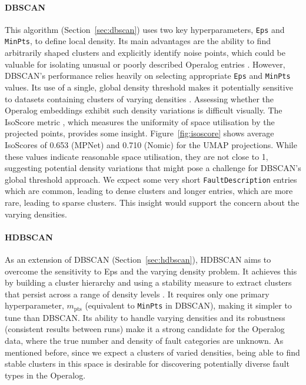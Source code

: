 \documentclass[10pt,oneside]{report}
\begin{document}
\paragraph{DBSCAN} This algorithm (Section~\ref{sec:dbscan}) uses two key hyperparameters, \texttt{Eps} and \texttt{MinPts}, to define local density. Its main advantages are the ability to find arbitrarily shaped clusters and explicitly identify noise points, which could be valuable for isolating unusual or poorly described Operalog entries \cite{ester1996density}. However, DBSCAN's performance relies heavily on selecting appropriate \texttt{Eps} and \texttt{MinPts} values. Its use of a single, global density threshold makes it potentially sensitive to datasets containing clusters of varying densities \cite{campello2013density}. Assessing whether the Operalog embeddings exhibit such density variations is difficult visually. The IsoScore metric \cite{rudman2021isoscore}, which measures the uniformity of space utilisation by the projected points, provides some insight. Figure~\ref{fig:isoscore} shows average IsoScores of 0.653 (MPNet) and 0.710 (Nomic) for the UMAP projections. While these values indicate reasonable space utilisation, they are not close to 1, suggesting potential density variations that might pose a challenge for DBSCAN's global threshold approach. We expect some very short \texttt{FaultDescription} entries which are common, leading to dense clusters and longer entries, which are more rare, leading to sparse clusters. This insight would support the concern about the varying densities.

\paragraph{HDBSCAN} As an extension of DBSCAN (Section~\ref{sec:hdbscan}), HDBSCAN aims to overcome the sensitivity to Eps and the varying density problem. It achieves this by building a cluster hierarchy and using a stability measure to extract clusters that persist across a range of density levels \cite{campello2013density}. It requires only one primary hyperparameter, $m_{\text{pts}}$ (equivalent to \texttt{MinPts} in DBSCAN), making it simpler to tune than DBSCAN. Its ability to handle varying densities and its robustness (consistent results between runs) make it a strong candidate for the Operalog data, where the true number and density of fault categories are unknown. As mentioned before, since we expect a clusters of varied densities, being able to find stable clusters in this space is desirable for discovering potentially diverse fault types in the Operalog.
\end{document}
